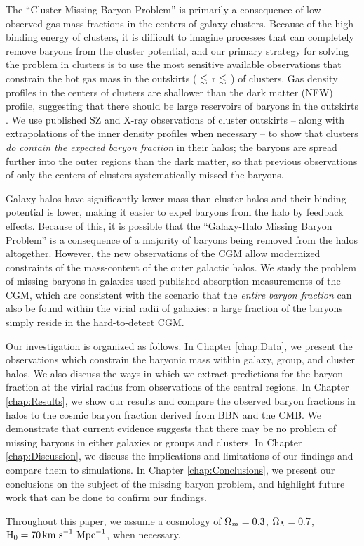 The ``Cluster Missing Baryon Problem'' is primarily a
consequence of low observed gas-mass-fractions in the centers of
galaxy clusters. Because of the high binding energy of clusters, it is
difficult to imagine processes that can completely remove baryons from
the cluster potential, and our primary strategy for solving the
problem in clusters is to use the most sensitive available
observations that constrain the hot gas mass in the outskirts
(\rfive{} $\lesssim$ r $\lesssim$ \rvir{}) of clusters. Gas density
profiles in the centers of clusters are shallower than the dark matter
(NFW) profile, suggesting that there should be large reservoirs of
baryons in the outskirts . We use published SZ and
X-ray observations of cluster outskirts -- along with extrapolations
of the inner density profiles when necessary -- to show that clusters
\textit{do contain the expected baryon fraction} in their halos; the
baryons are spread further into the outer regions than the dark
matter, so that previous observations of only the centers of clusters
systematically missed the baryons.

Galaxy halos have significantly lower mass than cluster halos and
their binding potential is lower, making it easier to expel baryons
from the halo by feedback effects. Because of this, it is possible
that the ``Galaxy-Halo Missing Baryon Problem'' is a consequence of a
majority of baryons being removed from the halos altogether. However,
the new observations of the CGM allow modernized constraints of the
mass-content of the outer galactic halos. We study the problem of
missing baryons in galaxies used published absorption measurements of
the CGM, which are consistent with the scenario that the
\textit{entire baryon fraction} can also be found within the virial
radii of galaxies: a large fraction of the baryons simply reside in
the hard-to-detect CGM.

Our investigation is organized as follows. In Chapter \ref{chap:Data}, we
present the observations which constrain the baryonic mass within
galaxy, group, and cluster halos. We also discuss the ways in which we
extract predictions for the baryon fraction at the virial radius from
observations of the central regions. In Chapter \ref{chap:Results},
we show our results and compare the observed baryon fractions in halos to the cosmic
baryon fraction derived from BBN and the CMB. We demonstrate that current
evidence suggests that there may be no problem of missing baryons in
either galaxies or groups and clusters. In Chapter \ref{chap:Discussion},
we discuss the implications and limitations of our findings and
compare them to simulations. In Chapter \ref{chap:Conclusions}, we
present our conclusions on the subject of the missing baryon problem,
and highlight future work that can be done to confirm our findings. 

Throughout this paper, we assume a cosmology of $\Omega_m = 0.3$,
$\Omega_\Lambda = 0.7$, $\textrm{H\ensuremath{_0}} = 70\,\textrm{km~s}^{-1}~\textrm{Mpc}^{-1}$, when
necessary. 
